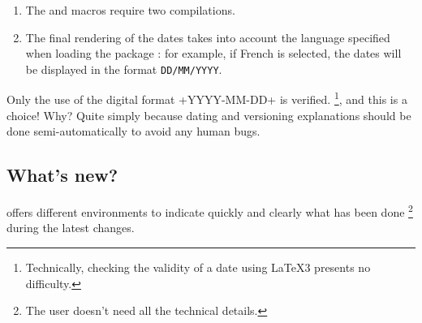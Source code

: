 \begin{tdocimportant}
    \leavevmode

    \begin{enumerate}
        \item The  and  macros require two compilations.

        \item The final rendering of the dates takes into account the language specified when loading the package \thispack{}: for example, if French is selected, the dates will be displayed in the format \texttt{DD/MM/YYYY}.
    \end{enumerate}
\end{tdocimportant}


\begin{tdocwarn}
    Only the use of the digital format \tdocinlatex+YYYY-MM-DD+ is verified.
    \footnote{
        Technically, checking the validity of a date using \LaTeX3 presents no difficulty.
    },
    and this is a choice! Why? Quite simply because dating and versioning explanations should be done semi-automatically to avoid any human bugs.
\end{tdocwarn}


\subsection{What's new?}

\thispack{} offers different environments to indicate quickly and clearly what has been done
\footnote{
    The user doesn't need all the technical details.
}
during the latest changes.


\begin{tdocexa}
    \leavevmode


\end{tdocexa}




\begin{tdocexa}
    \leavevmode


\end{tdocexa}




\begin{tdocexa}
    \leavevmode


\end{tdocexa}


